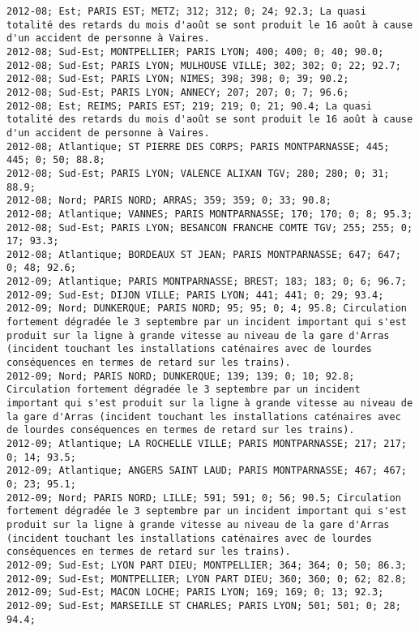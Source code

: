 \documentclass{article}
\begin{document}
\begin{Verbatim}[commandchars=\\\{\}]
2012-08; Est; PARIS EST; METZ; 312; 312; 0; 24; 92.3; La quasi totalité des retards du mois d'août se sont produit le 16 août à cause d'un accident de personne à Vaires.
2012-08; Sud-Est; MONTPELLIER; PARIS LYON; 400; 400; 0; 40; 90.0; 
2012-08; Sud-Est; PARIS LYON; MULHOUSE VILLE; 302; 302; 0; 22; 92.7; 
2012-08; Sud-Est; PARIS LYON; NIMES; 398; 398; 0; 39; 90.2; 
2012-08; Sud-Est; PARIS LYON; ANNECY; 207; 207; 0; 7; 96.6; 
2012-08; Est; REIMS; PARIS EST; 219; 219; 0; 21; 90.4; La quasi totalité des retards du mois d'août se sont produit le 16 août à cause d'un accident de personne à Vaires.
2012-08; Atlantique; ST PIERRE DES CORPS; PARIS MONTPARNASSE; 445; 445; 0; 50; 88.8; 
2012-08; Sud-Est; PARIS LYON; VALENCE ALIXAN TGV; 280; 280; 0; 31; 88.9; 
2012-08; Nord; PARIS NORD; ARRAS; 359; 359; 0; 33; 90.8; 
2012-08; Atlantique; VANNES; PARIS MONTPARNASSE; 170; 170; 0; 8; 95.3; 
2012-08; Sud-Est; PARIS LYON; BESANCON FRANCHE COMTE TGV; 255; 255; 0; 17; 93.3; 
2012-08; Atlantique; BORDEAUX ST JEAN; PARIS MONTPARNASSE; 647; 647; 0; 48; 92.6; 
2012-09; Atlantique; PARIS MONTPARNASSE; BREST; 183; 183; 0; 6; 96.7; 
2012-09; Sud-Est; DIJON VILLE; PARIS LYON; 441; 441; 0; 29; 93.4; 
2012-09; Nord; DUNKERQUE; PARIS NORD; 95; 95; 0; 4; 95.8; Circulation fortement dégradée le 3 septembre par un incident important qui s'est produit sur la ligne à grande vitesse au niveau de la gare d'Arras (incident touchant les installations caténaires avec de lourdes conséquences en termes de retard sur les trains).
2012-09; Nord; PARIS NORD; DUNKERQUE; 139; 139; 0; 10; 92.8; Circulation fortement dégradée le 3 septembre par un incident important qui s'est produit sur la ligne à grande vitesse au niveau de la gare d'Arras (incident touchant les installations caténaires avec de lourdes conséquences en termes de retard sur les trains).
2012-09; Atlantique; LA ROCHELLE VILLE; PARIS MONTPARNASSE; 217; 217; 0; 14; 93.5; 
2012-09; Atlantique; ANGERS SAINT LAUD; PARIS MONTPARNASSE; 467; 467; 0; 23; 95.1; 
2012-09; Nord; PARIS NORD; LILLE; 591; 591; 0; 56; 90.5; Circulation fortement dégradée le 3 septembre par un incident important qui s'est produit sur la ligne à grande vitesse au niveau de la gare d'Arras (incident touchant les installations caténaires avec de lourdes conséquences en termes de retard sur les trains).
2012-09; Sud-Est; LYON PART DIEU; MONTPELLIER; 364; 364; 0; 50; 86.3; 
2012-09; Sud-Est; MONTPELLIER; LYON PART DIEU; 360; 360; 0; 62; 82.8; 
2012-09; Sud-Est; MACON LOCHE; PARIS LYON; 169; 169; 0; 13; 92.3; 
2012-09; Sud-Est; MARSEILLE ST CHARLES; PARIS LYON; 501; 501; 0; 28; 94.4; 

\end{Verbatim}
\end{document}
